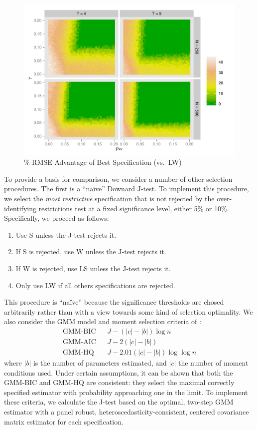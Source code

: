 \begin{figure}
\centering
\includegraphics[scale = 0.8]{RMSE_advantage_vs_LW}
\caption{\% RMSE Advantage of Best Specification (vs.\ LW)}
\label{fig:advantage}
\end{figure}


To provide a basis for comparison, we consider a number of other selection procedures. 
The first is a ``na\"{i}ve'' Downard J-test. 
To implement this procedure, we select the \emph{most restrictive} specification that is not rejected by the over-identifying restrictions test at a fixed significance level, either 5\% or 10\%. 
Specifically, we proceed as follows:
\begin{enumerate}
\item Use S unless the J-test rejects it. 
\item If S  is rejected, use W unless the J-test rejects it. 
\item If W is rejected, use LS unless the J-test rejects it. 
\item Only use LW if all others specifications are rejected.
\end{enumerate}
This procedure is ``na\"{i}ve'' because the significance thresholds are chosed arbitrarily rather than with a view towards some kind of selection optimality. 
We also consider the GMM model and moment selection criteria of \cite{AndrewsLu}: 
	\begin{eqnarray*}
	 \mbox{GMM-BIC} && J - (|c| - |b|) \log{n}\\
	 \mbox{GMM-AIC}&& J - 2(|c| - |b|)\\ 
	 \mbox{GMM-HQ} && J - 2.01 (|c| - |b|)  \log{\log{n}}
	\end{eqnarray*}
where $|b|$ is the number of parameters estimated, and $|c|$ the number of moment conditions used. 
Under certain assumptions, it can be shown that both the GMM-BIC and GMM-HQ are consistent: they select the maximal correctly specified estimator with probability approaching one in the limit. 
To implement these criteria, we calculate the J-test based on the optimal, two-step GMM estimator with a panel robust, heteroscedasticity-consistent, centered covariance matrix estimator for each specification.

